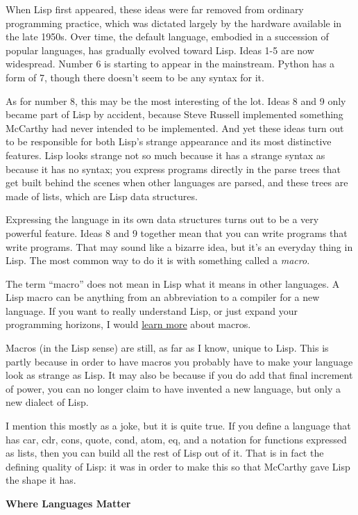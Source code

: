 When Lisp first appeared, these ideas were far removed from ordinary
programming practice, which was dictated largely by the hardware
available in the late 1950s. Over time, the default language, embodied
in a succession of popular languages, has gradually evolved toward Lisp.
Ideas 1-5 are now widespread. Number 6 is starting to appear in the
mainstream. Python has a form of 7, though there doesn't seem to be any
syntax for it.

As for number 8, this may be the most interesting of the lot. Ideas 8
and 9 only became part of Lisp by accident, because Steve Russell
implemented something McCarthy had never intended to be implemented. And
yet these ideas turn out to be responsible for both Lisp's strange
appearance and its most distinctive features. Lisp looks strange not so
much because it has a strange syntax as because it has no syntax; you
express programs directly in the parse trees that get built behind the
scenes when other languages are parsed, and these trees are made of
lists, which are Lisp data structures.

Expressing the language in its own data structures turns out to be a
very powerful feature. Ideas 8 and 9 together mean that you can write
programs that write programs. That may sound like a bizarre idea, but
it's an everyday thing in Lisp. The most common way to do it is with
something called a \emph{macro.}

The term ``macro'' does not mean in Lisp what it means in other
languages. A Lisp macro can be anything from an abbreviation to a
compiler for a new language. If you want to really understand Lisp, or
just expand your programming horizons, I would \href{onlisp.html}{learn
more} about macros.

Macros (in the Lisp sense) are still, as far as I know, unique to Lisp.
This is partly because in order to have macros you probably have to make
your language look as strange as Lisp. It may also be because if you do
add that final increment of power, you can no longer claim to have
invented a new language, but only a new dialect of Lisp.

I mention this mostly as a joke, but it is quite true. If you define a
language that has car, cdr, cons, quote, cond, atom, eq, and a notation
for functions expressed as lists, then you can build all the rest of
Lisp out of it. That is in fact the defining quality of Lisp: it was in
order to make this so that McCarthy gave Lisp the shape it has.

\textbf{Where Languages Matter}

